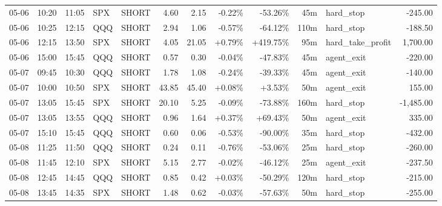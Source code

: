\documentclass[11pt,a4paper,twoside]{article}
\begin{document}
\begin{center}
\begin{longtable}{>{\color{txtmain}}l l l l l r r r r r >{\color{txtmain}}l r}
05-06 & 10:20 & 11:05 & SPX & SHORT & 4.60 & 2.15 & \textcolor{lossred}{-0.22\%} & \textcolor{lossred}{-53.26\%} & 45m & hard\_stop & \textcolor{lossred}{-245.00} \\
05-06 & 10:25 & 12:15 & QQQ & SHORT & 2.94 & 1.06 & \textcolor{lossred}{-0.57\%} & \textcolor{lossred}{-64.12\%} & 110m & hard\_stop & \textcolor{lossred}{-188.50} \\
05-06 & 12:15 & 13:50 & SPX & SHORT & 4.05 & 21.05 & \textcolor{wingreen}{+0.79\%} & \textcolor{wingreen}{+419.75\%} & 95m & hard\_take\_profit & \textcolor{wingreen}{1,700.00} \\
05-06 & 15:00 & 15:45 & QQQ & SHORT & 0.57 & 0.30 & \textcolor{lossred}{-0.04\%} & \textcolor{lossred}{-47.83\%} & 45m & agent\_exit & \textcolor{lossred}{-220.00} \\
05-07 & 09:45 & 10:30 & QQQ & SHORT & 1.78 & 1.08 & \textcolor{lossred}{-0.24\%} & \textcolor{lossred}{-39.33\%} & 45m & agent\_exit & \textcolor{lossred}{-140.00} \\
05-07 & 10:00 & 10:50 & SPX & SHORT & 43.85 & 45.40 & \textcolor{wingreen}{+0.08\%} & \textcolor{wingreen}{+3.53\%} & 50m & agent\_exit & \textcolor{wingreen}{155.00} \\
05-07 & 13:05 & 15:45 & SPX & SHORT & 20.10 & 5.25 & \textcolor{lossred}{-0.09\%} & \textcolor{lossred}{-73.88\%} & 160m & hard\_stop & \textcolor{lossred}{-1,485.00} \\
05-07 & 13:05 & 13:55 & QQQ & SHORT & 0.96 & 1.64 & \textcolor{wingreen}{+0.37\%} & \textcolor{wingreen}{+69.43\%} & 50m & agent\_exit & \textcolor{wingreen}{335.00} \\
05-07 & 15:10 & 15:45 & QQQ & SHORT & 0.60 & 0.06 & \textcolor{lossred}{-0.53\%} & \textcolor{lossred}{-90.00\%} & 35m & hard\_stop & \textcolor{lossred}{-432.00} \\
05-08 & 11:25 & 11:50 & QQQ & SHORT & 0.24 & 0.11 & \textcolor{lossred}{-0.76\%} & \textcolor{lossred}{-53.06\%} & 25m & hard\_stop & \textcolor{lossred}{-260.00} \\
05-08 & 11:45 & 12:10 & SPX & SHORT & 5.15 & 2.77 & \textcolor{lossred}{-0.02\%} & \textcolor{lossred}{-46.12\%} & 25m & agent\_exit & \textcolor{lossred}{-237.50} \\
05-08 & 12:45 & 14:45 & QQQ & SHORT & 0.85 & 0.42 & \textcolor{wingreen}{+0.03\%} & \textcolor{lossred}{-50.29\%} & 120m & hard\_stop & \textcolor{lossred}{-215.00} \\
05-08 & 13:45 & 14:35 & SPX & SHORT & 1.48 & 0.62 & \textcolor{lossred}{-0.03\%} & \textcolor{lossred}{-57.63\%} & 50m & hard\_stop & \textcolor{lossred}{-255.00} \\

\end{longtable}
\end{center}
\end{document}

